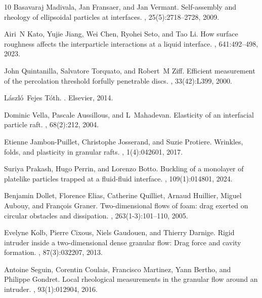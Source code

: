 \documentclass[twocolumn, prl,
 amsmath,amssymb,
 superscriptaddress,aps,
]{revtex4-2}
\begin{document}
\begin{thebibliography}{10}
	Basavaraj Madivala, Jan Fransaer, and Jan Vermant.
	\newblock Self-assembly and rheology of ellipsoidal particles at interfaces.
	, 25(5):2718--2728, 2009.

	Airi~N Kato, Yujie Jiang, Wei Chen, Ryohei Seto, and Tao Li.
	\newblock How surface roughness affects the interparticle interactions at a
	liquid interface.
	, 641:492--498, 2023.

	John Quintanilla, Salvatore Torquato, and Robert~M Ziff.
	\newblock Efficient measurement of the percolation threshold forfully
	penetrable discs.
	, 33(42):L399,
	2000.

	László~Fejes T{\'o}th.
	.
	\newblock Elsevier, 2014.

	Dominic Vella, Pascale Aussillous, and L~Mahadevan.
	\newblock Elasticity of an interfacial particle raft.
	, 68(2):212, 2004.

	Etienne Jambon-Puillet, Christophe Josserand, and Suzie Protiere.
	\newblock Wrinkles, folds, and plasticity in granular rafts.
	, 1(4):042601, 2017.

	Suriya Prakash, Hugo Perrin, and Lorenzo Botto.
	\newblock Buckling of a monolayer of platelike particles trapped at a
	fluid-fluid interface.
	, 109(1):014801, 2024.

	Benjamin Dollet, Florence Elias, Catherine Quilliet, Arnaud Huillier, Miguel
	Aubouy, and Fran{\c{c}}ois Graner.
	\newblock Two-dimensional flows of foam: drag exerted on circular obstacles and
	dissipation.
	, 263(1-3):101--110, 2005.

	Evelyne Kolb, Pierre Cixous, Niels Gaudouen, and Thierry Darnige.
	\newblock Rigid intruder inside a two-dimensional dense granular flow: Drag
	force and cavity formation.
	, 87(3):032207, 2013.

	Antoine Seguin, Corentin Coulais, Francisco Martinez, Yann Bertho, and Philippe
	Gondret.
	\newblock Local rheological measurements in the granular flow around an
	intruder.
	, 93(1):012904, 2016.


\end{thebibliography}
\end{document}

